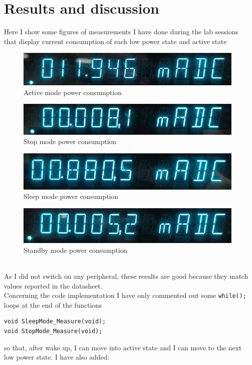 \documentclass[peerreview]{IEEEtran}
\begin{document}
\section{Results and discussion}
Here I show some figures of measurements I have done during the lab sessions that display current consumption of each low power state and active state
\begin{figure}[!ht]
\centering
\includegraphics[width=0.6\columnwidth]{adc_active} 
\caption{Active mode power consumption}
\label{fig_A}
\end{figure}
\begin{figure}[!ht]
\centering
\includegraphics[width=0.6\columnwidth]{adc_stop} 
\caption{Stop mode power consumption}
\label{fig_B}
\end{figure}
\begin{figure}[!ht]
\centering
\includegraphics[width=0.6\columnwidth]{adc_sleep} 
\caption{Sleep mode power consumption}
\label{fig_C}
\end{figure}
\begin{figure}[!ht]
\centering
\includegraphics[width=0.6\columnwidth]{adc_standby} 
\caption{Standby mode power consumption}
\label{fig_D}
\end{figure}
\\As I did not switch on any peripheral, these results are good because they match values reported in the datasheet.\\
Concerning the code implementation I have only commented out some \lstinline[style=CStyle]{while();} loops at the end of the functions 
\begin{lstlisting}[style=CStyle]
void SleepMode_Measure(void);
void StopMode_Measure(void);
\end{lstlisting}
so that, after wake up, I can move into active state and I can move to the next low power state. I have also added:
\end{document}

